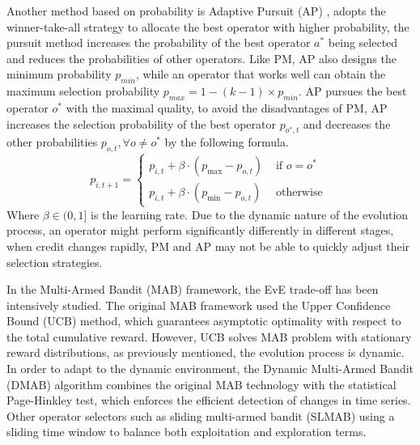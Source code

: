\documentclass[journal]{IEEEtran}
\begin{document}
Another method based on probability is Adaptive Pursuit (AP) \cite{thierens2007adaptive}, adopts the winner-take-all strategy to allocate the best operator with higher probability, the pursuit method increases the probability of the best operator $a^*$ being selected and reduces the probabilities of other operators.
Like PM, AP also designs the minimum probability $p_{min}$, while an operator that works well can obtain the maximum selection probability $p_{max} = 1-(k-1)\times p_{min}$.
AP pursues the best operator $o^*$ with the maximal quality, to avoid the disadvantages of PM, AP increases the selection probability of the best operator $p_{o^*,t}$ and decreases the other probabilities $p_{o,t}, \forall o \neq o^*$ by the following formula.
\begin{equation}
  p_{i, t+1}=\left\{\begin{array}{ll}
    p_{i, t}+\beta \cdot\left(p_{\max }-p_{o, t}\right) & \text { if } o=o^{*} \\
    p_{i, t}+\beta \cdot\left(p_{\min }-p_{o, t}\right) & \text { otherwise }
  \end{array}\right.
  \label{eq: AP}
\end{equation}
Where $\beta \in (0,1]$ is the learning rate.
% 
% 
Due to the dynamic nature of the evolution process, an operator might perform significantly differently in different stages, when credit changes rapidly, PM and AP may not be able to quickly adjust their selection strategies.

In the Multi-Armed Bandit (MAB) framework, the EvE trade-off has been intensively studied.
The original MAB framework used the Upper Confidence Bound (UCB) \cite{auer2002finite} method, which guarantees asymptotic optimality with respect to the total cumulative reward. However, UCB solves MAB problem with stationary reward distributions, as previously mentioned, the evolution process is dynamic.
In order to adapt to the dynamic environment, the Dynamic Multi-Armed Bandit (DMAB) \cite{dacosta2008adaptive} algorithm combines the original MAB technology with the statistical Page-Hinkley test, which enforces the efficient detection of changes in time series.
Other operator selectors such as sliding multi-armed bandit (SLMAB) \cite{fialho2010analyzing} using a sliding time window to balance both exploitation and exploration terms.
\end{document}
